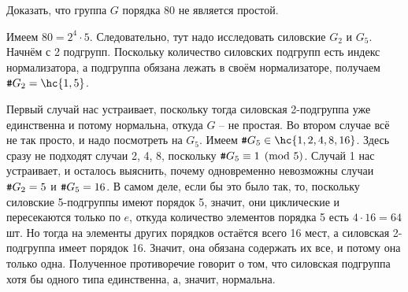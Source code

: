 \documentclass[a4paper]{article}
\begin{document}
\begin{problem}
Доказать, что группа $G$ порядка 80 не является простой.
\end{problem}
\begin{solution}
Имеем $80=2^4\cdot 5$. Следовательно, тут надо исследовать силовские $G_2$ и $G_5$. Начнём с
2 подгрупп. Поскольку количество силовских подгрупп есть индекс нормализатора, а подгруппа обязана
лежать в своём нормализаторе, получаем $\verb"#" G_2 = \hc{1, 5}$.

Первый случай нас устраивает, поскольку тогда силовская 2-подгруппа уже единственна и потому нормальна,
откуда $G$ -- не простая. Во втором случае всё не так просто,
и надо посмотреть на $G_5$. Имеем $\verb"#" G_5 \in \hc{1, 2, 4, 8, 16}$.
Здесь сразу не подходят случаи 2, 4, 8, поскольку $\verb"#" G_5 \equiv 1 \pmod 5$. Случай 1 нас устраивает, и
осталось выяснить, почему одновременно невозможны случаи $\verb"#" G_2 = 5$ и $\verb"#" G_5 = 16$. В самом
деле, если бы это было так, то, поскольку силовские 5-подгруппы имеют порядок 5, значит, они циклические и
пересекаются только по $e$, откуда количество элементов порядка 5 есть $4 \cdot 16=64$ шт. Но тогда на
элементы других порядков остаётся всего 16 мест, а силовская 2-подгруппа имеет порядок 16. Значит, она
обязана содержать их все, и потому она только одна. Полученное противоречие говорит о том, что силовская
подгруппа хотя бы одного типа единственна, а, значит, нормальна.
\end{solution}
\end{document}
